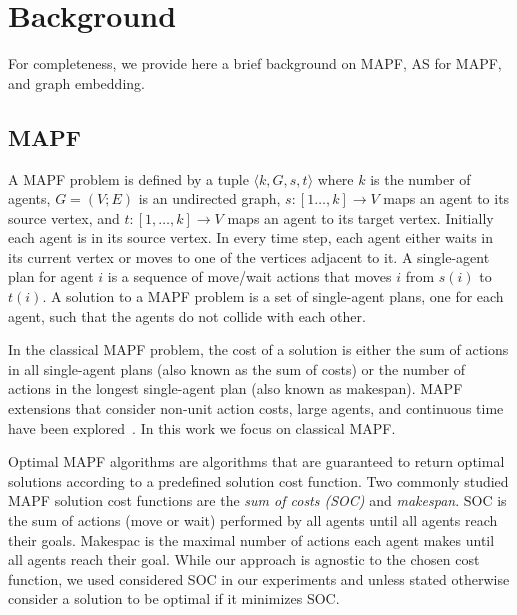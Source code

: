 \documentclass{ecai}
\newcommand{\tuple}[1]{\ensuremath{\langle #1\rangle}}
\newcommand{\Roni}[1]{}
\begin{document}





\section{Background}
\label{scn:Background}


For completeness, we provide here a brief background on MAPF, AS for MAPF, and graph embedding. 

\subsection{MAPF}
A MAPF problem is defined by a tuple $\tuple{k,G,s,t}$ 
where 
$k$ is the number of agents, 
$G = (V;E)$ is an undirected graph, 
$s: [1\ldots, k]\rightarrow V$ maps an agent to its source vertex, 
and $t: [1,\ldots, k]\rightarrow V$ maps an agent to its target vertex. 
Initially each agent is in its source vertex.
In every time step, each agent either waits
in its current vertex or moves to one of the vertices adjacent to it. 
A single-agent plan for agent $i$ is a sequence of move/wait actions that moves $i$ from $s(i)$ to $t(i)$. 
A solution to a MAPF problem is a set of single-agent plans, one for each agent, such that the agents do not collide with each other. 

In the classical MAPF problem, the cost of a solution is either the sum of actions in all single-agent plans (also known as the sum of costs) or the number of actions in the longest single-agent plan (also known as makespan). 
MAPF extensions that consider non-unit action costs, large agents, and continuous time have been explored~\cite{atzmon2020generalizing,andreychuk2022multi,li2019multi}. 
In this work we focus on classical MAPF. 


Optimal MAPF algorithms are algorithms that are guaranteed to return optimal solutions according to a predefined solution cost function. Two commonly studied MAPF solution cost functions are the \emph{sum of costs (SOC)} and \emph{makespan}. SOC is the sum of actions (move or wait) performed by all agents until all agents reach their goals. Makespac is the maximal number of actions each agent makes until all agents reach their goal. While our approach is agnostic to the chosen cost function, we used considered SOC in our experiments and unless stated otherwise consider a solution to be optimal if it minimizes SOC. 
\end{document}
